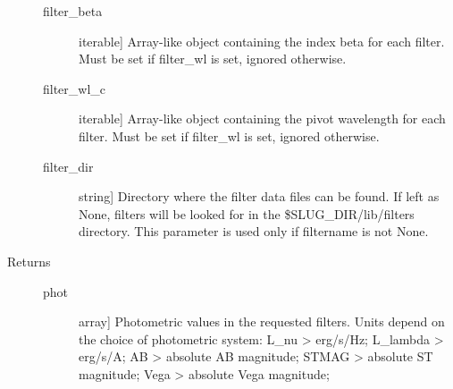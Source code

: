 \documentclass[letterpaper,10pt,english]{sphinxmanual}
\begin{document}
\begin{fulllineitems}
\begin{description}
\begin{description}
\item[{filter\_beta}] \leavevmode{[}iterable{]}
Array-like object containing the index beta for each
filter. Must be set if filter\_wl is set, ignored otherwise.

\item[{filter\_wl\_c}] \leavevmode{[}iterable{]}
Array-like object containing the pivot wavelength for each
filter. Must be set if filter\_wl is set, ignored otherwise.

\item[{filter\_dir}] \leavevmode{[}string{]}
Directory where the filter data files can be found. If left as
None, filters will be looked for in the \$SLUG\_DIR/lib/filters
directory. This parameter is used only if filtername is not
None.

\end{description}

\item[{Returns}] \leavevmode\begin{description}
\item[{phot}] \leavevmode{[}array{]}
Photometric values in the requested filters. Units depend on
the choice of photometric system:
L\_nu \textendash{}\textgreater{} erg/s/Hz;
L\_lambda \textendash{}\textgreater{} erg/s/A;
AB \textendash{}\textgreater{} absolute AB magnitude;
STMAG \textendash{}\textgreater{} absolute ST magnitude;
Vega \textendash{}\textgreater{} absolute Vega magnitude;

\end{description}

\end{description}

\end{fulllineitems}

\end{document}
